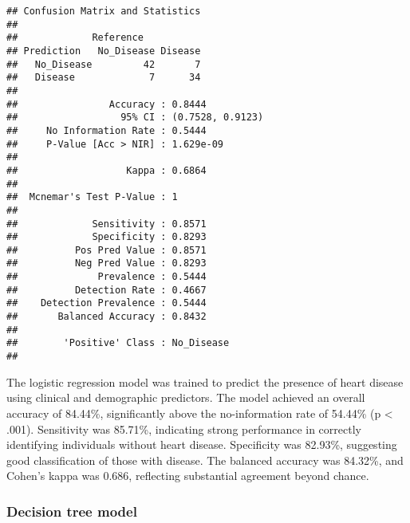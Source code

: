 \documentclass[
]{article}
\begin{document}
\begin{verbatim}
## Confusion Matrix and Statistics
## 
##             Reference
## Prediction   No_Disease Disease
##   No_Disease         42       7
##   Disease             7      34
##                                           
##                Accuracy : 0.8444          
##                  95% CI : (0.7528, 0.9123)
##     No Information Rate : 0.5444          
##     P-Value [Acc > NIR] : 1.629e-09       
##                                           
##                   Kappa : 0.6864          
##                                           
##  Mcnemar's Test P-Value : 1               
##                                           
##             Sensitivity : 0.8571          
##             Specificity : 0.8293          
##          Pos Pred Value : 0.8571          
##          Neg Pred Value : 0.8293          
##              Prevalence : 0.5444          
##          Detection Rate : 0.4667          
##    Detection Prevalence : 0.5444          
##       Balanced Accuracy : 0.8432          
##                                           
##        'Positive' Class : No_Disease      
## 
\end{verbatim}

The logistic regression model was trained to predict the presence of
heart disease using clinical and demographic predictors. The model
achieved an overall accuracy of 84.44\%, significantly above the
no-information rate of 54.44\% (p \textless{} .001). Sensitivity was
85.71\%, indicating strong performance in correctly identifying
individuals without heart disease. Specificity was 82.93\%, suggesting
good classification of those with disease. The balanced accuracy was
84.32\%, and Cohen's kappa was 0.686, reflecting substantial agreement
beyond chance.

\subsubsection{Decision tree model}\label{decision-tree-model}
\end{document}
